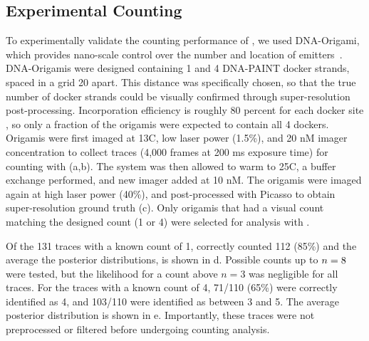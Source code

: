 \subsection{Experimental Counting}
To experimentally validate the counting performance of \ours, we used DNA-Origami, 
which provides nano-scale control over the number and location of emitters~\citep{rothemund_folding_2006}.
	DNA-Origamis were designed containing 1 and 4 DNA-PAINT docker strands, 
	spaced in a grid 20 \nanometer apart. 
	This distance was specifically chosen, so that the true number of docker strands 
	could be visually confirmed through super-resolution post-processing.
	Incorporation efficiency is roughly 80 percent for each docker site \cite{strauss_2018}, 
	so only a fraction of the origamis were expected to contain all 4 dockers. 
	Origamis were first imaged at 13\textdegree C, low laser power (1.5\%), and 20 nM imager concentration to 
	collect traces (4,000 frames at 200 ms exposure time) for counting with \ours (a,b).
	The system was then allowed to warm to 25\textdegree C, a buffer exchange performed, and new imager 
	added at 10 nM.
	The origamis were imaged again at high laser power (40\%),
	and post-processed with Picasso \citep{schnitzbauer_2017} to obtain super-resolution ground truth (c).
	Only origamis that had a visual count matching the designed count (1 or 4) were selected for analysis with \ours.

Of the 131 traces with a known count of 1, \ours correctly counted 112 (85\%)
and the average the posterior distributions, is shown in d.
	Possible counts up to $n=8$ were tested, but the likelihood for a count above $n=3$ was negligible for all traces.
	For the traces with a known count of 4, 71/110 (65\%) were correctly identified as 4, 
	and 103/110 were identified as between 3 and 5. 
	The average posterior distribution is shown in e.
	Importantly, these traces were not preprocessed or filtered before undergoing \ours counting analysis.
